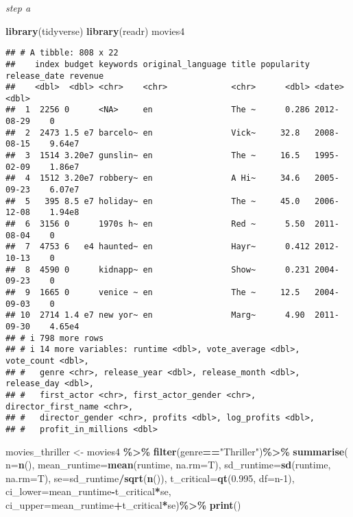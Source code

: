 \documentclass[
]{article}
\newenvironment{Shaded}{\begin{snugshade}}{\end{snugshade}}
\newcommand{\AttributeTok}[1]{\textcolor[rgb]{0.13,0.29,0.53}{#1}}
\newcommand{\DecValTok}[1]{\textcolor[rgb]{0.00,0.00,0.81}{#1}}
\newcommand{\FloatTok}[1]{\textcolor[rgb]{0.00,0.00,0.81}{#1}}
\newcommand{\FunctionTok}[1]{\textcolor[rgb]{0.13,0.29,0.53}{\textbf{#1}}}
\newcommand{\NormalTok}[1]{#1}
\newcommand{\OtherTok}[1]{\textcolor[rgb]{0.56,0.35,0.01}{#1}}
\newcommand{\SpecialCharTok}[1]{\textcolor[rgb]{0.81,0.36,0.00}{\textbf{#1}}}
\newcommand{\StringTok}[1]{\textcolor[rgb]{0.31,0.60,0.02}{#1}}
\begin{document}
\emph{step a}

\begin{Shaded}
\begin{Highlighting}[]
\FunctionTok{library}\NormalTok{(tidyverse)}
\FunctionTok{library}\NormalTok{(readr)}
\NormalTok{movies4}
\end{Highlighting}
\end{Shaded}

\begin{verbatim}
## # A tibble: 808 x 22
##    index budget keywords original_language title popularity release_date revenue
##    <dbl>  <dbl> <chr>    <chr>             <chr>      <dbl> <date>         <dbl>
##  1  2256 0      <NA>     en                The ~      0.286 2012-08-29    0     
##  2  2473 1.5 e7 barcelo~ en                Vick~     32.8   2008-08-15    9.64e7
##  3  1514 3.20e7 gunslin~ en                The ~     16.5   1995-02-09    1.86e7
##  4  1512 3.20e7 robbery~ en                A Hi~     34.6   2005-09-23    6.07e7
##  5   395 8.5 e7 holiday~ en                The ~     45.0   2006-12-08    1.94e8
##  6  3156 0      1970s h~ en                Red ~      5.50  2011-08-04    0     
##  7  4753 6   e4 haunted~ en                Hayr~      0.412 2012-10-13    0     
##  8  4590 0      kidnapp~ en                Show~      0.231 2004-09-23    0     
##  9  1665 0      venice ~ en                The ~     12.5   2004-09-03    0     
## 10  2714 1.4 e7 new yor~ en                Marg~      4.90  2011-09-30    4.65e4
## # i 798 more rows
## # i 14 more variables: runtime <dbl>, vote_average <dbl>, vote_count <dbl>,
## #   genre <chr>, release_year <dbl>, release_month <dbl>, release_day <dbl>,
## #   first_actor <chr>, first_actor_gender <chr>, director_first_name <chr>,
## #   director_gender <chr>, profits <dbl>, log_profits <dbl>,
## #   profit_in_millions <dbl>
\end{verbatim}

\begin{Shaded}
\begin{Highlighting}[]
\NormalTok{movies\_thriller }\OtherTok{\textless{}{-}}\NormalTok{ movies4 }\SpecialCharTok{\%\textgreater{}\%}
  \FunctionTok{filter}\NormalTok{(genre}\SpecialCharTok{==}\StringTok{"Thriller"}\NormalTok{)}\SpecialCharTok{\%\textgreater{}\%}
  \FunctionTok{summarise}\NormalTok{(}
    \AttributeTok{n=}\FunctionTok{n}\NormalTok{(),}
    \AttributeTok{mean\_runtime=}\FunctionTok{mean}\NormalTok{(runtime, }\AttributeTok{na.rm=}\NormalTok{T),}
    \AttributeTok{sd\_runtime=}\FunctionTok{sd}\NormalTok{(runtime, }\AttributeTok{na.rm=}\NormalTok{T),}
    \AttributeTok{se=}\NormalTok{sd\_runtime}\SpecialCharTok{/}\FunctionTok{sqrt}\NormalTok{(}\FunctionTok{n}\NormalTok{()),}
    \AttributeTok{t\_critical=}\FunctionTok{qt}\NormalTok{(}\FloatTok{0.995}\NormalTok{, }\AttributeTok{df=}\NormalTok{n}\DecValTok{{-}1}\NormalTok{),}
    \AttributeTok{ci\_lower=}\NormalTok{mean\_runtime}\SpecialCharTok{{-}}\NormalTok{t\_critical}\SpecialCharTok{*}\NormalTok{se,}
    \AttributeTok{ci\_upper=}\NormalTok{mean\_runtime}\SpecialCharTok{+}\NormalTok{t\_critical}\SpecialCharTok{*}\NormalTok{se)}\SpecialCharTok{\%\textgreater{}\%}
  \FunctionTok{print}\NormalTok{()}
\end{Highlighting}
\end{Shaded}
\end{document}
